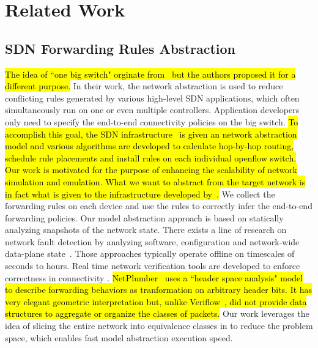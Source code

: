 \section{Related Work}
\label{Sec:relatedwork}

\subsection{SDN Forwarding Rules Abstraction}
\hl{
The idea of ``one big switch" orginate from~\mbox{\cite{OneBigSwitchAbstraction}} but the authors
proposed it for a different purpose.
}
In their work, the network abstraction is used to reduce conflicting rules generated by various
high-level SDN applications, which often simultaneously run on one or even multiple controllers.
Application developers only need to specify the end-to-end connectivity policies on the big switch.
\hl{
To accomplish this goal, the SDN infrastructure~\mbox{\cite{OneBigSwitchAbstraction}}
is given an network abstraction model and various algorithms are developed to calculate hop-by-hop routing,
schedule rule placements and install rules on each individual openflow switch.
Our work is motivated for the purpose of enhancing the scalability of network simulation and emulation.
What we want to abstract from the target network is in fact what is given to the
infrastructure developed by~\mbox{\cite{OneBigSwitchAbstraction}}.
}
We collect the forwarding rules on each device and use the rules to correctly infer the end-to-end forwarding policies.
Our model abstraction approach is based on statically analyzing snapshots of the network state.
There exists a line of research on network fault detection by analyzing software,
configuration and network-wide data-plane state~\cite{Al-Shaer2010,Al-Shaer2009,Anteater2011,xz+05}.
Those approaches typically operate offline on timescales of seconds to hours.
Real time network verification tools are developed to enforce correctness in connectivity \cite{NetPlumber2013,Veriflow}.
\hl{
NetPlumber~\mbox{\cite{NetPlumber2013}} uses a ``header space analysis" model to
describe forwarding behaviors as tranformation on arbitrary header bits.
It has very elegant geometric interpretation but, unlike Veriflow~\mbox{\cite{Veriflow}}, did not
provide data structures to aggregate or organize the classes of packets.
}
Our work leverages the idea of slicing the entire network into equivalence classes in \cite{Veriflow} to reduce the problem space, which enables fast model abstraction execution speed.


